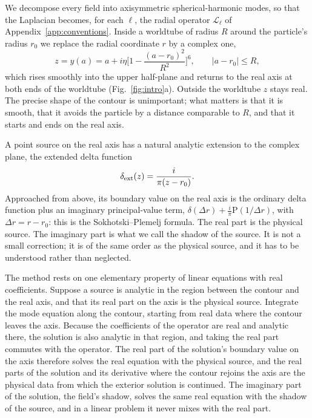\documentclass[aps,prd,twocolumn,superscriptaddress,nofootinbib,floatfix]{revtex4-2}
\newcommand{\dext}{\delta_{\rm ext}}
\newcommand{\Lop}{\mathcal{L}_\ell}
\begin{document}
We decompose every field into axisymmetric spherical-harmonic modes, so that the Laplacian becomes, for each $\ell$, the radial operator $\Lop$ of Appendix~\ref{app:conventions}.
Inside a worldtube of radius $R$ around the particle's radius $r_0$ we replace the radial coordinate $r$ by a complex one,
\begin{equation}
z=y(a)=a+i\eta\Big[1-\frac{(a-r_0)^2}{R^2}\Big]^6,\qquad |a-r_0|\le R,
\label{eq:contour}
\end{equation}
which rises smoothly into the upper half-plane and returns to the real axis at both ends of the worldtube (Fig.~\ref{fig:intro}a).
Outside the worldtube $z$ stays real.
The precise shape of the contour is unimportant; what matters is that it is smooth, that it avoids the particle by a distance comparable to $R$, and that it starts and ends on the real axis.

A point source on the real axis has a natural analytic extension to the complex plane, the extended delta function
\begin{equation}
\dext(z)=\frac{i}{\pi(z-r_0)}.
\label{eq:dext}
\end{equation}
Approached from above, its boundary value on the real axis is the ordinary delta function plus an imaginary principal-value term, $\delta(\Delta r)+\tfrac{i}{\pi}\mathrm{P}(1/\Delta r)$, with $\Delta r=r-r_0$: this is the Sokhotski--Plemelj formula.
The real part is the physical source.
The imaginary part is what we call the shadow of the source.
It is not a small correction; it is of the same order as the physical source, and it has to be understood rather than neglected.

The method rests on one elementary property of linear equations with real coefficients.
Suppose a source is analytic in the region between the contour and the real axis, and that its real part on the axis is the physical source.
Integrate the mode equation along the contour, starting from real data where the contour leaves the axis.
Because the coefficients of the operator are real and analytic there, the solution is also analytic in that region, and taking the real part commutes with the operator.
The real part of the solution's boundary value on the axis therefore solves the real equation with the physical source, and the real parts of the solution and its derivative where the contour rejoins the axis are the physical data from which the exterior solution is continued.
The imaginary part of the solution, the field's shadow, solves the same real equation with the shadow of the source, and in a linear problem it never mixes with the real part.
\end{document}
